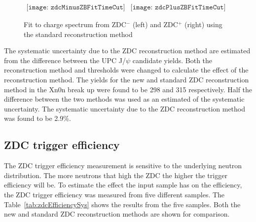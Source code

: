       \begin{figure}[!Hhtb]
        \centering
        $ \begin{array}{cc}
          \texttt{[image: zdcMinusZBFitTimeCut]} &
          \texttt{[image: zdcPlusZBFitTimeCut]}
        \end{array} $
        \caption{Fit to charge spectrum from ZDC$^{-}$ (left) and ZDC$^{+}$ 
          (right) using the standard reconstruction method}
        \label{fig:zdcM1Fit}
      \end{figure}

      The systematic uncertainty due to the ZDC reconstruction method are
        estimated from the difference between the UPC J/$\psi$ candidate yields.
      Both the reconstruction method and thresholds were changed to calculate 
        the effect of the reconstruction method.
      The yields for the new and standard ZDC reconstruction method in the Xn0n
        break up were found to be 298 and 315 respectively. 
      Half the difference between the two methods was used as an estimated of 
        the systematic uncertainty.
      The systematic uncertainty due to the ZDC reconstruction method was 
        found to be 2.9\%.

    \subsection{ZDC trigger efficiency}
      The ZDC trigger efficiency measurement is sensitive to the underlying 
        neutron distribution.
      The more neutrons that high the ZDC the higher the trigger efficiency 
        will be.
      To estimate the effect the input sample has on the efficiency, the ZDC 
        trigger efficiency was measured from five different samples.
      The Table~\ref{tab:zdcEfficiencySys} shows the results from the 
       five samples. 
      Both the new and standard ZDC reconstruction methods are shown for 
        comparison.

